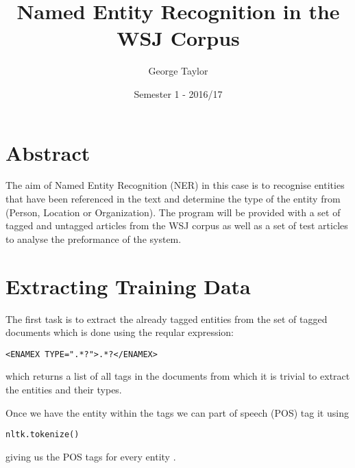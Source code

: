 \documentclass[draft]{article}
\title{Named Entity Recognition in the WSJ Corpus}
\author{George Taylor}
\date{Semester 1 - 2016/17}
\begin{document}
\nocite{*}


\maketitle
\begin{multicols*}{2}

\section*{Abstract}
The aim of Named Entity Recognition (NER) in this case is to recognise entities that have been referenced in the text and determine the type of the entity from (Person, Location or Organization). The program will be provided with a set of tagged and untagged articles from the WSJ corpus as well as a set of test articles to analyse the preformance of the system.

\section*{Extracting Training Data}
The first task is to extract the already tagged entities from the set of tagged documents which is done using the reqular expression: \begin{verbatim}<ENAMEX TYPE=".*?">.*?</ENAMEX>\end{verbatim} which returns a list of all tags in the documents from which it is trivial to extract the entities and their types.

Once we have the entity within the tags we can part of speech (POS) tag it using \begin{verbatim}nltk.tokenize()\end{verbatim} giving us the POS tags for every entity \citep{NLPChunker}.


\end{multicols*}
\end{document}
